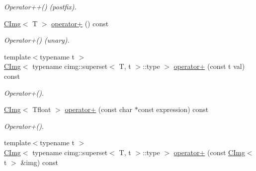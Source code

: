 \begin{DoxyCompactItemize}
\begin{DoxyCompactList}\small\item\em Operator++() (postfix). \item\end{DoxyCompactList}\item 
\hyperlink{structcimg__library_1_1CImg}{CImg}$<$ T $>$ \hyperlink{structcimg__library_1_1CImg_a637e0346bd7e4426d32e32aab42bd3f6}{operator+} () const 
\begin{DoxyCompactList}\small\item\em Operator+() (unary). \item\end{DoxyCompactList}\item 
\hypertarget{structcimg__library_1_1CImg_a2ebf115569440e729b6df40dae48f23c}{
{\footnotesize template$<$typename t $>$ }\\\hyperlink{structcimg__library_1_1CImg}{CImg}$<$ typename cimg::superset$<$ T, t $>$::type $>$ \hyperlink{structcimg__library_1_1CImg_a2ebf115569440e729b6df40dae48f23c}{operator+} (const t val) const }
\label{structcimg__library_1_1CImg_a2ebf115569440e729b6df40dae48f23c}

\begin{DoxyCompactList}\small\item\em Operator+(). \item\end{DoxyCompactList}\item 
\hypertarget{structcimg__library_1_1CImg_aacf20519686cae446c56db9e3e33472f}{
\hyperlink{structcimg__library_1_1CImg}{CImg}$<$ Tfloat $>$ \hyperlink{structcimg__library_1_1CImg_aacf20519686cae446c56db9e3e33472f}{operator+} (const char $\ast$const expression) const }
\label{structcimg__library_1_1CImg_aacf20519686cae446c56db9e3e33472f}

\begin{DoxyCompactList}\small\item\em Operator+(). \item\end{DoxyCompactList}\item 
\hypertarget{structcimg__library_1_1CImg_a70160d1fff077b920e659f57a7d80d2e}{
{\footnotesize template$<$typename t $>$ }\\\hyperlink{structcimg__library_1_1CImg}{CImg}$<$ typename cimg::superset$<$ T, t $>$::type $>$ \hyperlink{structcimg__library_1_1CImg_a70160d1fff077b920e659f57a7d80d2e}{operator+} (const \hyperlink{structcimg__library_1_1CImg}{CImg}$<$ t $>$ \&img) const }
\label{structcimg__library_1_1CImg_a70160d1fff077b920e659f57a7d80d2e}


\end{DoxyCompactItemize}
